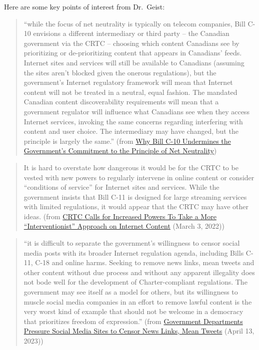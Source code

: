 \documentclass[
]{book}
\theoremstyle{definition}
\theoremstyle{definition}
\theoremstyle{definition}
\theoremstyle{definition}
\theoremstyle{remark}
\begin{document}
\begin{reflect}
Here are some key points of interest from Dr.~Geist:

\begin{quote}
``while the focus of net neutrality is typically on telecom companies, Bill C-10 envisions a different intermediary or third party -- the Canadian government via the CRTC -- choosing which content Canadians see by prioritizing or de-prioritizing content that appears in Canadians' feeds. Internet sites and services will still be available to Canadians (assuming the sites aren't blocked given the onerous regulations), but the government's Internet regulatory framework will mean that Internet content will not be treated in a neutral, equal fashion. The mandated Canadian content discoverability requirements will mean that a government regulator will influence what Canadians see when they access Internet services, invoking the same concerns regarding interfering with content and user choice. The intermediary may have changed, but the principle is largely the same.'' (from \href{https://www.michaelgeist.ca/2021/05/why-bill-c-10-undermines-the-governments-commitment-to-the-principle-of-net-neutrality/}{Why Bill C-10 Undermines the Government's Commitment to the Principle of Net Neutrality})
\end{quote}

\begin{quote}
It is hard to overstate how dangerous it would be for the CRTC to be vested with new powers to regularly intervene in online content or consider ``conditions of service'' for Internet sites and services. While the government insists that Bill C-11 is designed for large streaming services with limited regulations, it would appear that the CRTC may have other ideas. (from \href{https://www.michaelgeist.ca/2022/03/crtc-calls-for-more-powers-to-take-a-more-interventionist-approach-on-internet-content/}{CRTC Calls for Increased Powers To Take a More ``Interventionist'' Approach on Internet Content} (March 3, 2022))
\end{quote}

\begin{quote}
``it is difficult to separate the government's willingness to censor social media posts with its broader Internet regulation agenda, including Bills C-11, C-18 and online harms. Seeking to remove news links, mean tweets and other content without due process and without any apparent illegality does not bode well for the development of Charter-compliant regulations. The government may see itself as a model for others, but its willingness to muscle social media companies in an effort to remove lawful content is the very worst kind of example that should not be welcome in a democracy that prioritizes freedom of expression.'' (from \href{https://www.michaelgeist.ca/2023/04/government-departments-pressure-social-media-sites-to-censor-news-links-mean-tweets/}{Government Departments Pressure Social Media Sites to Censor News Links, Mean Tweets} (April 13, 2023))
\end{quote}


\end{reflect}
\end{document}
